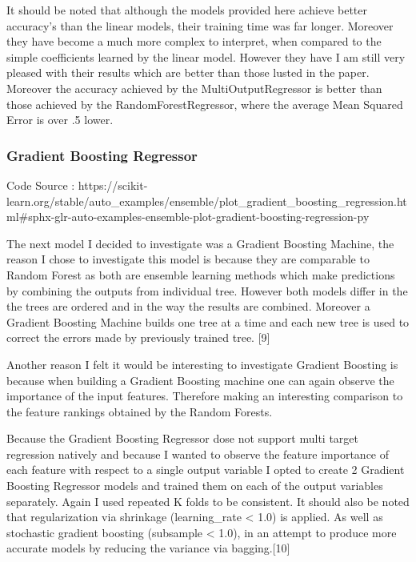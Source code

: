 \documentclass[11pt]{article}
\begin{document}
It should be noted that although the models provided here achieve better
accuracy's than the linear models, their training time was far longer.
Moreover they have become a much more complex to interpret, when
compared to the simple coefficients learned by the linear model. However
they have I am still very pleased with their results which are better
than those lusted in the paper. Moreover the accuracy achieved by the
MultiOutputRegressor is better than those achieved by the
RandomForestRegressor, where the average Mean Squared Error is over .5
lower.

    \hypertarget{gradient-boosting-regressor}{%
\subsubsection{Gradient Boosting
Regressor}\label{gradient-boosting-regressor}}

Code Source :
https://scikit-learn.org/stable/auto\_examples/ensemble/plot\_gradient\_boosting\_regression.html\#sphx-glr-auto-examples-ensemble-plot-gradient-boosting-regression-py

The next model I decided to investigate was a Gradient Boosting Machine,
the reason I chose to investigate this model is because they are
comparable to Random Forest as both are ensemble learning methods which
make predictions by combining the outputs from individual tree. However
both models differ in the the trees are ordered and in the way the
results are combined. Moreover a Gradient Boosting Machine builds one
tree at a time and each new tree is used to correct the errors made by
previously trained tree. {[}9{]}

Another reason I felt it would be interesting to investigate Gradient
Boosting is because when building a Gradient Boosting machine one can
again observe the importance of the input features. Therefore making an
interesting comparison to the feature rankings obtained by the Random
Forests.

Because the Gradient Boosting Regressor dose not support multi target
regression natively and because I wanted to observe the feature
importance of each feature with respect to a single output variable I
opted to create 2 Gradient Boosting Regressor models and trained them on
each of the output variables separately. Again I used repeated K folds
to be consistent. It should also be noted that regularization via
shrinkage (learning\_rate \textless{} 1.0) is applied. As well as
stochastic gradient boosting (subsample \textless{} 1.0), in an attempt
to produce more accurate models by reducing the variance via
bagging.{[}10{]}
\end{document}
